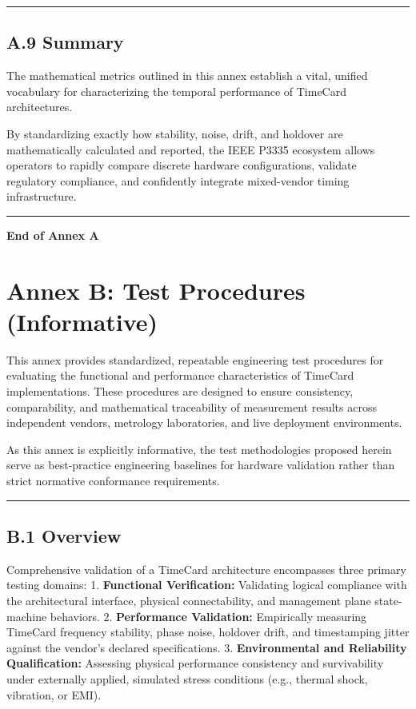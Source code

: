 \documentclass[
]{article}
\begin{document}
\begin{center}\rule{0.5\linewidth}{0.5pt}\end{center}

\subsection{A.9 Summary}\label{a.9-summary}

The mathematical metrics outlined in this annex establish a vital,
unified vocabulary for characterizing the temporal performance of
TimeCard architectures.

By standardizing exactly how stability, noise, drift, and holdover are
mathematically calculated and reported, the IEEE P3335 ecosystem allows
operators to rapidly compare discrete hardware configurations, validate
regulatory compliance, and confidently integrate mixed-vendor timing
infrastructure.

\begin{center}\rule{0.5\linewidth}{0.5pt}\end{center}

\textbf{End of Annex A}

\section{Annex B: Test Procedures
(Informative)}\label{annex-b-test-procedures-informative}

This annex provides standardized, repeatable engineering test procedures
for evaluating the functional and performance characteristics of
TimeCard implementations. These procedures are designed to ensure
consistency, comparability, and mathematical traceability of measurement
results across independent vendors, metrology laboratories, and live
deployment environments.

As this annex is explicitly informative, the test methodologies proposed
herein serve as best-practice engineering baselines for hardware
validation rather than strict normative conformance requirements.

\begin{center}\rule{0.5\linewidth}{0.5pt}\end{center}

\subsection{B.1 Overview}\label{b.1-overview}

Comprehensive validation of a TimeCard architecture encompasses three
primary testing domains: 1. \textbf{Functional Verification:} Validating
logical compliance with the architectural interface, physical
connectability, and management plane state-machine behaviors. 2.
\textbf{Performance Validation:} Empirically measuring TimeCard
frequency stability, phase noise, holdover drift, and timestamping
jitter against the vendor's declared specifications. 3.
\textbf{Environmental and Reliability Qualification:} Assessing physical
performance consistency and survivability under externally applied,
simulated stress conditions (e.g., thermal shock, vibration, or EMI).
\end{document}
